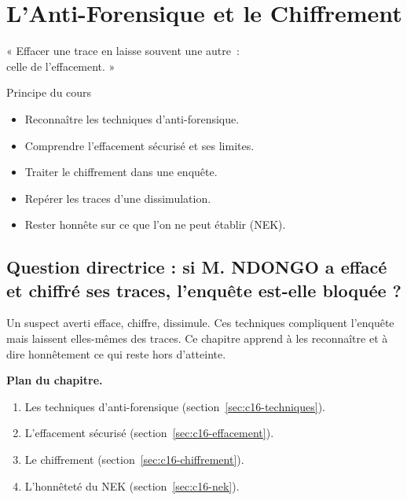 
\chapter{L'Anti-Forensique et le Chiffrement}
\label{chap:anti}

\epigraph{%
    « Effacer une trace en laisse souvent une autre~:\\
    celle de l'effacement. »%
}{Principe du cours}


\begin{boxobjectifs}
\begin{itemize}
    \item Reconnaître les techniques d'anti-forensique.
    \item Comprendre l'effacement sécurisé et ses limites.
    \item Traiter le chiffrement dans une enquête.
    \item Repérer les traces d'une dissimulation.
    \item Rester honnête sur ce que l'on ne peut établir (NEK).
\end{itemize}
\end{boxobjectifs}

\bigskip

\section*{Question directrice : si M. NDONGO a effacé et chiffré ses traces, l'enquête est-elle bloquée ?}

Un suspect averti efface, chiffre, dissimule. Ces techniques compliquent
l'enquête mais laissent elles-mêmes des traces. Ce chapitre apprend à les
reconnaître et à dire honnêtement ce qui reste hors d'atteinte.

\medskip
\textbf{Plan du chapitre.}
\begin{enumerate}
    \item Les techniques d'anti-forensique (section~\ref{sec:c16-techniques}).
    \item L'effacement sécurisé (section~\ref{sec:c16-effacement}).
    \item Le chiffrement (section~\ref{sec:c16-chiffrement}).
    \item L'honnêteté du NEK (section~\ref{sec:c16-nek}).
\end{enumerate}

